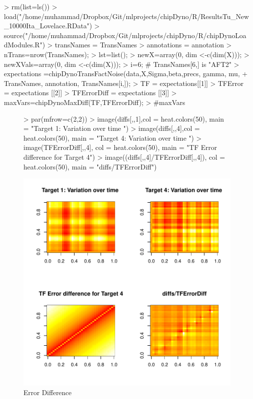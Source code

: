 \documentclass{article}
\begin{document}
\begin{Schunk}
\begin{Sinput}
> rm(list=ls())
> load("/home/muhammad/Dropbox/Git/mlprojects/chipDyno/R/ResultsTu_New_10000Ita_Lovelace.RData")
> source("/home/muhammad/Dropbox/Git/mlprojects/chipDyno/R/chipDynoLoadModules.R")
> transNames = TransNames
> annotations = annotation
> nTrans=nrow(TransNames);
> lst=list();
> newX=array(0, dim <-c(dim(X)));
> newXVals=array(0, dim <-c(dim(X)));
> i=6; # TransNames[6,] is "AFT2"
> expectations =chipDynoTransFactNoise(data,X,Sigma,beta,precs, gamma, mu, 
+   					TransNames, annotation, TransNames[i,]);
> TF = expectations[[1]]
> TFError = expectations [[2]]
> TFErrorDiff = expectations [[3]]
> maxVars=chipDynoMaxDiff(TF,TFErrorDiff);
> #maxVars
\end{Sinput}
\end{Schunk}


\begin{figure}
\begin{Schunk}
\begin{Sinput}
> par(mfrow=c(2,2))
> image(diffs[,,1],col = heat.colors(50), main = "Target 1: Variation over time ")
> image(diffs[,,4],col = heat.colors(50), main = "Target 4: Variation over time ")
> image(TFErrorDiff[,,4], col = heat.colors(50), main = "TF Error difference for Target 4")
> image((diffs[,,4]/TFErrorDiff[,,4]), col = heat.colors(50), main = "diffs/TFErrorDiff")
\end{Sinput}
\end{Schunk}
\includegraphics{chipDyno-figure6}
\caption{Error Difference}
\label{Error_Diff}
\end{figure}
\end{document}
